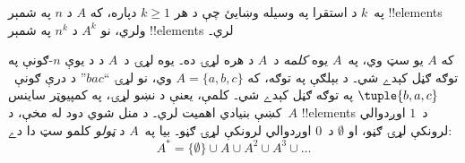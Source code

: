 \documentclass[../../../include/open-logic-section]{subfiles}
\begin{document}
\begin{prob}
په~$k$ د استقرا په وسيله وښايئ چې د هر $k \ge 1$ دپاره، که $A$ د $n$ په شمېر !!{element}s ولري، نو $A^k$ د $n^k$ په شمېر !!{element}s لري۔
\end{prob}

\begin{ex}
که $A$ يو سټ وي، په~$A$ يوه \emph{کلمه} د~$A$ د  هره لړۍ ده۔ يوه لړۍ د~$A$ د  د يوې $n$-ګونې په توګه ګڼل کېدے شي۔ د بېلګې په توګه، که $A = \{a, b, c\}$ وي، نو لړۍ ``$bac$'' د درې ګونې~$\tuple{b, a, c}$ په توګه ګڼل کېدے شي۔ کلمې، يعنې د نښو لړۍ، په کمپيوټر ساينس کښې بنيادي اهميت لري۔ د منل شوي دود له مخې، د~$A$ !!{element}s د~$1$ اوږدوالي لرونکې لړۍ ګڼو، او $\emptyset$ د~$0$ اوږدوالي لرونکې لړۍ ګڼو۔ بيا په~$A$ د \emph{ټولو} کلمو سټ دا دے:
\[
A^* = \{\emptyset\} \cup A \cup A^2 \cup A^3 \cup \dots
\]
\end{ex}
\end{document}
